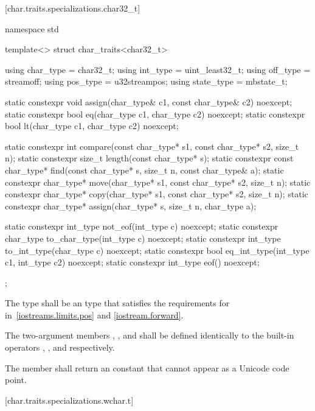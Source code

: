 [char.traits.specializations.char32_t]{}

%
\begin{codeblock}
namespace std {
  template<> struct char_traits<char32_t> {
    using char_type  = char32_t;
    using int_type   = uint_least32_t;
    using off_type   = streamoff;
    using pos_type   = u32streampos;
    using state_type = mbstate_t;

    static constexpr void assign(char_type& c1, const char_type& c2) noexcept;
    static constexpr bool eq(char_type c1, char_type c2) noexcept;
    static constexpr bool lt(char_type c1, char_type c2) noexcept;

    static constexpr int compare(const char_type* s1, const char_type* s2, size_t n);
    static constexpr size_t length(const char_type* s);
    static constexpr const char_type* find(const char_type* s, size_t n,
                                           const char_type& a);
    static constexpr char_type* move(char_type* s1, const char_type* s2, size_t n);
    static constexpr char_type* copy(char_type* s1, const char_type* s2, size_t n);
    static constexpr char_type* assign(char_type* s, size_t n, char_type a);

    static constexpr int_type not_eof(int_type c) noexcept;
    static constexpr char_type to_char_type(int_type c) noexcept;
    static constexpr int_type to_int_type(char_type c) noexcept;
    static constexpr bool eq_int_type(int_type c1, int_type c2) noexcept;
    static constexpr int_type eof() noexcept;
  };
}
\end{codeblock}

\pnum
The type
shall be an  type that satisfies the requirements
for  in~\ref{iostreams.limits.pos} and \ref{iostream.forward}.

\pnum
The two-argument members ,
, and  shall be defined identically to
the built-in operators \tcode{=}, \tcode{==}, and
\tcode{<} respectively.

\pnum
The member  shall return an
 constant that cannot appear as a Unicode
code point.

[char.traits.specializations.wchar.t]{}

